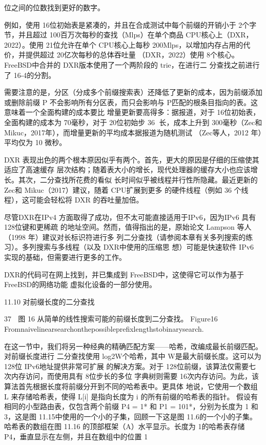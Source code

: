 位之间的位数找到更好的数字。




例如，使用 16位初始表是紧凑的，并且在合成测试中每个前缀的开销小于 2个字节，并且超过
100百万次每秒的查找（Mlps）在单个商品 CPU核心上（DXR，2022）。使用 21位允许在单个
CPU核心上每秒 200Mlps，以增加内存占用的代价，并提供超过 20亿次每秒的总体吞吐量
（DXR，2022）使用 8个核心。FreeBSD中合并的 DXR版本使用了一个两阶段的 trie，在进行二
分查找之前进行了 16-4的分割。



需要注意的是，分区（分成多个前缀搜索表）还降低了更新的成本，因为前缀添加或删除前缀 P
不会影响所有分区表，而只会影响与 P匹配的根条目指向的表。这意味着一个全面构建的成本要比
增量更新要高得多：据报道，对于 16位初始表，全面构建的成本为 70毫秒，对于 20位初始步
                                                     36
长，成本上升到 300毫秒（Zec和 Mikuc，2017年），而增量更新的平均成本据报道为随机测试
（Zec等人，2012 年）平均仅为 10 微秒。



DXR 表现出色的两个根本原因似乎有两个。首先，更大的原因是仔细的压缩使其适应了高速缓存
层次结构；随着表大小的增长，现代处理器的缓存大小也应该增长。其次，二分查找所花费的看似
长时间似乎被线程并行性所隐藏。最近更新的 Zec和 Mikuc（2017）建议，随着 CPU扩展到更多
的硬件线程（例如 36 个线程），这可能会轻松将 DXR 的吞吐量加倍。



尽管DXR在IPv4 方面取得了成功，但不太可能直接适用于IPv6，因为IPv6 具有 128位键和更稀疏
的地址空间。然而，值得指出的是，原始论文 Lampson 等人（1998 年）建议对长标识符进行多
列二分查找（请参阅本章有关多列搜索的练习）。多列搜索与多线程（以及 DXR中使用的压缩思
想）可能是快速软件 IPv6 实现的基础，但需要进行更多的工作。



DXR的代码可在网上找到，并已集成到 FreeBSD中，这使得它可以作为基于 FreeBSD的网络功能
虚拟化设备的一部分使用。



11.10 对前缀长度的二分查找



                                                   37
               图 16 从简单的线性搜索可能的前缀长度到二分查找。
     Figure16 Fromnaivelinearsearchonthepossibleprefixlengthstobinarysearch.

在这一节中，我们将另一种经典的精确匹配方案——哈希，改编成最长前缀匹配。对前缀长度进行
二分查找使用 log2W个哈希，其中 W是最大前缀长度。这可以为 128位 IPv6地址提供非常可扩展
的解决方案。对于 128位前缀，该算法仅需要七次内存访问，而使用具有 8位步长的多位
字典树则需要 16次内存访问。为此，该算法首先根据长度将前缀分开到不同的哈希表中。更具体
地说，它使用一个数组 L 来存储哈希表，使得 L[i] 是指向长度为 i 的所有前缀的哈希表的指针。
假设有相同的小型路由表，仅包含两个前缀 P4 = 1* 和 P1 = 101*，分别为长度为 1 和 3，这是图
11.15中使用的一个小的子集，回顾一下这是图 11.6的一个小的子集。哈希表的数组在图 11.16
的顶部框架（A）水平显示。长度为 1的哈希表存储 P4，垂直显示在左侧，并且在数组中的位置 1



